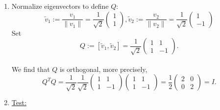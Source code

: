 {\begin{enumerate}
\begin{enumerate}
\begin{enumerate}
		\begin{align*}
		(A-\lambda_2 I)v^{\textcolor{red}{2}}=0 &\Leftrightarrow \begin{pmatrix}3&3\\3&3\end{pmatrix}\begin{pmatrix}v_1^{\textcolor{red}{2}}\\v_2^{\textcolor{red}{2}}\end{pmatrix}=0\\
		&\Leftrightarrow 3v_1^{\textcolor{red}{2}}+3v_2^{\textcolor{red}{2}} =0\\
		&\Leftrightarrow v_1^{\textcolor{red}{2}} =- v_2^{\textcolor{red}{2}}.
		\end{align*}
		Choose, e.g., $v^{\textcolor{red}{2}} = \begin{pmatrix}1\\-1\end{pmatrix}$.
	\end{enumerate}
	\item Normalize eigenvectors to define $Q$:\\
	$$\tilde{v}_1:=\frac{v_1}{\| v_1\|}=\frac{1}{\sqrt{2}}\begin{pmatrix}1\\1\end{pmatrix}, \tilde{v}_2:=\frac{v_2}{\| v_2\|}=\frac{1}{\sqrt{2}}\begin{pmatrix}1\\-1\end{pmatrix}$$
	Set $$Q:=[\tilde{v}_1, \tilde{v}_2] = \frac{1}{\sqrt{2}}\begin{pmatrix}1&1\\1&-1\end{pmatrix}.$$\\
	We find that $Q$ is orthogonal, more precisely, $$Q^TQ =\frac{1}{\sqrt{2}}\frac{1}{\sqrt{2}}\begin{pmatrix}1&1\\1&-1\end{pmatrix}\begin{pmatrix}1&1\\1&-1\end{pmatrix}=\frac{1}{2}\begin{pmatrix}2&0\\0&2\end{pmatrix} = I.$$
	\item 
	\underline{Test:} 
	\begin{align*} 

\end{align*}
\end{enumerate}
\end{enumerate}}
